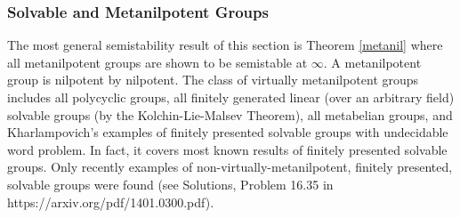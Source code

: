 \documentclass[12pt]{article}
\begin{document}
 
 
\subsubsection{Solvable and Metanilpotent Groups}\label{SolMet}

The most general semistability result of this section is Theorem \ref{metanil} where all metanilpotent groups are shown to be semistable at $\infty$. 
A metanilpotent group is nilpotent by nilpotent. The class of virtually metanilpotent groups includes all polycyclic groups, all finitely generated linear (over an arbitrary field) solvable groups (by the Kolchin-Lie-Malsev Theorem), all metabelian groups, and Kharlampovich's examples of finitely presented solvable groups with undecidable word problem. In fact, it covers most known results of finitely presented solvable groups. Only recently examples of non-virtually-metanilpotent, finitely presented, solvable groups were found (see Solutions, Problem 16.35 in https://arxiv.org/pdf/1401.0300.pdf). 
\end{document}
